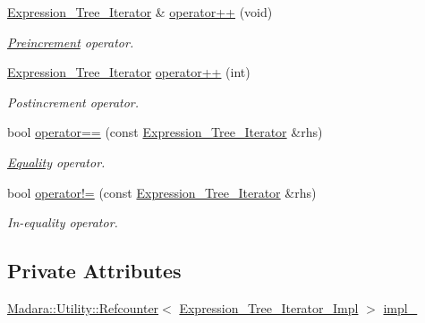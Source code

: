 \begin{DoxyCompactItemize}
\hyperlink{classMadara_1_1Expression__Tree_1_1Expression__Tree__Iterator}{Expression\_\-Tree\_\-Iterator} \& \hyperlink{classMadara_1_1Expression__Tree_1_1Expression__Tree__Iterator_a0b05ae16e194e8624c71d71c26c1f7bd}{operator++} (void)
\begin{DoxyCompactList}\small\item\em \hyperlink{classMadara_1_1Expression__Tree_1_1Preincrement}{Preincrement} operator. \item\end{DoxyCompactList}\item 
\hyperlink{classMadara_1_1Expression__Tree_1_1Expression__Tree__Iterator}{Expression\_\-Tree\_\-Iterator} \hyperlink{classMadara_1_1Expression__Tree_1_1Expression__Tree__Iterator_aa146f724c383288551d18cf65895366f}{operator++} (int)
\begin{DoxyCompactList}\small\item\em Postincrement operator. \item\end{DoxyCompactList}\item 
bool \hyperlink{classMadara_1_1Expression__Tree_1_1Expression__Tree__Iterator_a46eee28defc1e5b676371543d63e181d}{operator==} (const \hyperlink{classMadara_1_1Expression__Tree_1_1Expression__Tree__Iterator}{Expression\_\-Tree\_\-Iterator} \&rhs)
\begin{DoxyCompactList}\small\item\em \hyperlink{classMadara_1_1Expression__Tree_1_1Equality}{Equality} operator. \item\end{DoxyCompactList}\item 
bool \hyperlink{classMadara_1_1Expression__Tree_1_1Expression__Tree__Iterator_a1b95ff53c6cdd03c4e43d15ec9cb46ef}{operator!=} (const \hyperlink{classMadara_1_1Expression__Tree_1_1Expression__Tree__Iterator}{Expression\_\-Tree\_\-Iterator} \&rhs)
\begin{DoxyCompactList}\small\item\em In-\/equality operator. \item\end{DoxyCompactList}\end{DoxyCompactItemize}
\subsection*{Private Attributes}
\begin{DoxyCompactItemize}
\item 
\hyperlink{classMadara_1_1Utility_1_1Refcounter}{Madara::Utility::Refcounter}$<$ \hyperlink{classMadara_1_1Expression__Tree_1_1Expression__Tree__Iterator__Impl}{Expression\_\-Tree\_\-Iterator\_\-Impl} $>$ \hyperlink{classMadara_1_1Expression__Tree_1_1Expression__Tree__Iterator_a6d6f041e45f74315fa81515aa64f63b3}{impl\_\-}
\end{DoxyCompactItemize}


